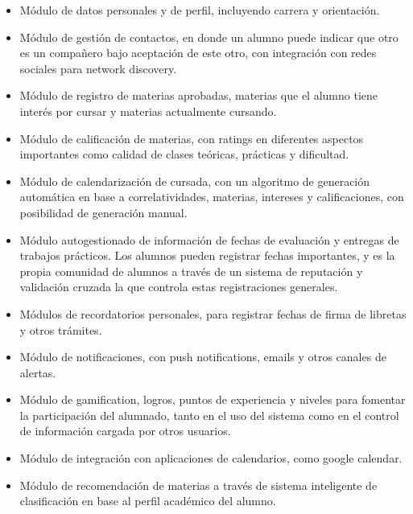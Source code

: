 \documentclass[a4paper,11pt]{article}
\begin{document}
\begin{itemize}
    \item Módulo de datos personales y de perfil, incluyendo carrera y
      orientación.

    \item Módulo de gestión de contactos, en donde un alumno puede indicar que
      otro es un compañero bajo aceptación de este otro, con integración con
      redes sociales para network discovery.

    \item Módulo de registro de materias aprobadas, materias que el alumno
      tiene interés por cursar y materias actualmente cursando.

    \item Módulo de calificación de materias, con ratings en diferentes
      aspectos importantes como calidad de clases teóricas, prácticas y
      dificultad.

    \item Módulo de calendarización de cursada, con un algoritmo de generación
      automática en base a correlatividades, materias, intereses y
      calificaciones, con posibilidad de generación manual.

    \item Módulo autogestionado de información de fechas de evaluación y
      entregas de trabajos prácticos. Los alumnos pueden registrar fechas
      importantes, y es la propia comunidad de alumnos a través de un sistema
      de reputación y validación cruzada la que controla estas registraciones
      generales.

    \item Módulos de recordatorios personales, para registrar fechas de firma
      de libretas y otros trámites.

    \item Módulo de notificaciones, con push notifications, emails y otros
      canales de alertas.

    \item Módulo de gamification, logros, puntos de experiencia y niveles para
      fomentar la participación del alumnado, tanto en el uso del sistema como
      en el control de información cargada por otros usuarios.

    \item Módulo de integración con aplicaciones de calendarios, como google
      calendar.

    \item Módulo de recomendación de materias a través de sistema inteligente
      de clasificación en base al perfil académico del alumno.

\end{itemize}
\end{document}
